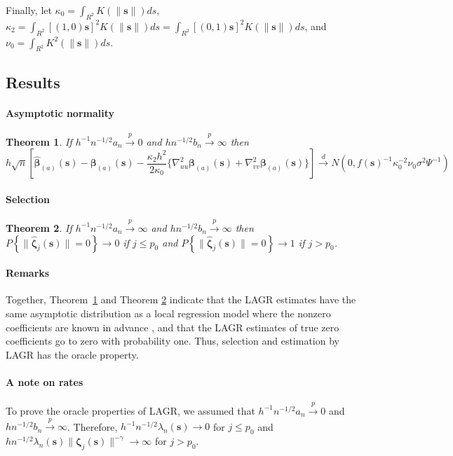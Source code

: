 \documentclass[authoryear, review, 11pt]{elsarticle}
\newtheorem{theorem}{Theorem}[section]
\begin{document}
        Finally, let $\kappa_0 = \int_{R^2} K(\|\bm{s}\|) ds$, $\kappa_2 = \int_{R^2} [(1,0)\bm{s}]^2 K(\|\bm{s}\|) ds = \int_{R^2} [(0,1)\bm{s}]^2 K(\|\bm{s}\|) ds$, and $\nu_0 = \int_{R^2} K^2(\|\bm{s}\|) ds$.

        \subsection{Results}
        \paragraph{Asymptotic normality}
        \begin{theorem} \label{theorem:normality} 
            If $h^{-1} n^{-1/2} a_n \xrightarrow{p} 0$ and $h n^{-1/2} b_n \xrightarrow{p} \infty$ then \[h \sqrt{n} \left[ \hat{\bm{\beta}}_{(a)}(\bm{s}) - \bm{\beta}_{(a)}(\bm{s}) - \frac{\kappa_2 h^2}{2 \kappa_0} \{ \nabla_{uu}^2 \bm{\beta}_{(a)} (\bm{s}) + \nabla_{vv}^2 \bm{\beta}_{(a)} (\bm{s}) \} \right] \xrightarrow{d} N(0, f(\bm{s})^{-1} \kappa_0^{-2} \nu_0 \sigma^2 \Psi^{-1} )\]
        \end{theorem}

        \paragraph{Selection}
        \begin{theorem} \label{theorem:selection}  
            If $h^{-1} n^{-1/2} a_n \xrightarrow{p} \infty$ and $h n^{-1/2} b_n \xrightarrow{p} \infty$ then $P \left\{ \| \hat{\bm{\zeta}}_j (\bm{s}) \| = 0 \right\} \to 0$ if $j \le p_0$ and $P \left\{ \| \hat{\bm{\zeta}}_j (\bm{s}) \| = 0 \right\} \to 1$ if $j > p_0$.
        \end{theorem}

        \paragraph{Remarks}
        Together, Theorem \ref{theorem:normality} and Theorem \ref{theorem:selection} indicate that the LAGR estimates have the same asymptotic distribution as a local regression model where the nonzero coefficients are known in advance \citep{Sun-Yan-Zhang-Lu-2014}, and that the LAGR estimates of true zero coefficients go to zero with probability one. Thus, selection and estimation by LAGR has the oracle property.

        \paragraph{A note on rates}
        To prove the oracle properties of LAGR, we assumed that $h^{-1} n^{-1/2} a_n \xrightarrow{p} 0$ and $h n^{-1/2} b_n \xrightarrow{p} \infty$. Therefore, $h^{-1} n^{-1/2} \lambda_n(\bm{s})  \to 0$ for $j \le p_0$ and $h n^{-1/2} \lambda_n(\bm{s}) \| \bm{\zeta}_j(\bm{s}) \|^{-\gamma} \to \infty$ for $j > p_0$.
        
\end{document}

